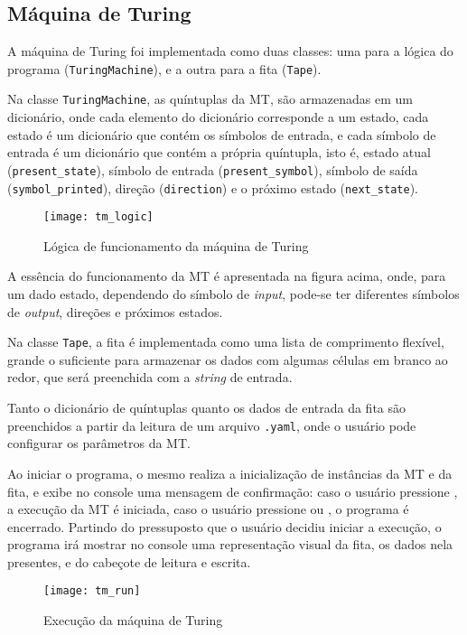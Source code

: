 \subsection{Máquina de Turing}

A máquina de Turing foi implementada como duas classes: uma para a lógica do
programa (\verb|TuringMachine|), e a outra para a fita (\verb|Tape|).

Na classe \verb|TuringMachine|, as quíntuplas da MT, são armazenadas em um
dicionário, onde cada elemento do dicionário corresponde a um estado, cada
estado é um dicionário que contém os símbolos de entrada, e cada símbolo de
entrada é um dicionário que contém a própria quíntupla, isto é, estado atual
(\verb|present_state|), símbolo de entrada (\verb|present_symbol|), símbolo de
saída \linebreak (\verb|symbol_printed|), direção (\verb|direction|) e o próximo
estado (\verb|next_state|).

\begin{figure}[H]
    \centering
    \texttt{[image: tm\_logic]}
    \caption{Lógica de funcionamento da máquina de Turing}
    \label{fig:tm_logic}
\end{figure}

A essência do funcionamento da MT é apresentada na figura acima, onde, para um
dado estado, dependendo do símbolo de \textit{input}, pode-se ter diferentes
símbolos de \textit{output}, direções e próximos estados.

Na classe \verb|Tape|, a fita é implementada como uma lista de comprimento
flexível, grande o suficiente para armazenar os dados com algumas células em
branco ao redor, que será preenchida com a \textit{string} de entrada.

Tanto o dicionário de quíntuplas quanto os dados de entrada da fita são
preenchidos a partir da leitura de um arquivo \verb|.yaml|, onde o usuário pode
configurar os parâmetros da MT.

Ao iniciar o programa, o mesmo realiza a inicialização de instâncias da MT e da
fita, e exibe no console uma mensagem de confirmação: caso o usuário pressione
\keys{\return}, a execução da MT é iniciada, caso o usuário pressione
 ou , o programa é encerrado. Partindo do
pressuposto que o usuário decidiu iniciar a execução, o programa irá mostrar no
console uma representação visual da fita, os dados nela presentes, e do cabeçote
de leitura e escrita.

\begin{figure}[H]
    \centering
    \texttt{[image: tm\_run]}
    \caption{Execução da máquina de Turing}
    \label{fig:tm_run}
\end{figure}

